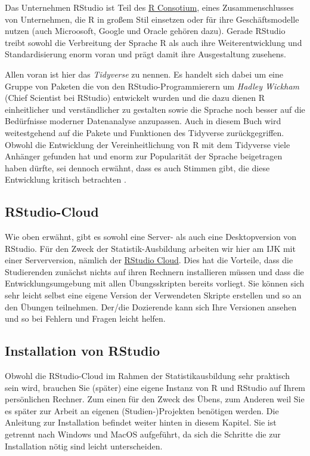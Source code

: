 \documentclass[
]{book}
\begin{document}
Das Unternehmen RStudio ist Teil des \href{https://www.r-consortium.org/}{R Consotium}, eines Zusammenschlusses von Unternehmen, die R in großem Stil einsetzen oder für ihre Geschäftsmodelle nutzen (auch Microosoft, Google und Oracle gehören dazu).
Gerade RStudio treibt sowohl die Verbreitung der Sprache R als auch ihre Weiterentwicklung und Standardisierung enorm voran und prägt damit ihre Ausgestaltung zusehens.

Allen voran ist hier das \emph{Tidyverse} zu nennen. Es handelt sich dabei um eine Gruppe von Paketen die von den RStudio-Programmierern um \emph{Hadley Wickham} (Chief Scientist bei RStudio) entwickelt wurden und die dazu dienen R einheitlicher und verständlicher zu gestalten sowie die Sprache noch besser auf die Bedürfnisse moderner Datenanalyse anzupassen. Auch in diesem Buch wird weitestgehend auf die Pakete und Funktionen des Tidyverse zurückgegriffen.
Obwohl die Entwicklung der Vereinheitlichung von R mit dem Tidyverse viele Anhänger gefunden hat und enorm zur Popularität der Sprache beigetragen haben dürfte, sei dennoch erwähnt, dass es auch Stimmen gibt, die diese Entwicklung kritisch betrachten \citep{Matloff_2019, McChesney_2020}.

\hypertarget{rstudio-cloud}{%
\subsection{RStudio-Cloud}\label{rstudio-cloud}}

Wie oben erwähnt, gibt es sowohl eine Server- als auch eine Desktopversion von RStudio.
Für den Zweck der Statistik-Ausbildung arbeiten wir hier am IJK mit einer Serverversion, nämlich der \href{https://rstudio.cloud/}{RStudio Cloud}.
Dies hat die Vorteile, dass die Studierenden zunächst nichts auf ihren Rechnern installieren müssen und dass die Entwicklungsumgebung mit allen Übungsskripten bereits vorliegt.
Sie können sich sehr leicht selbst eine eigene Version der Verwendeten Skripte erstellen und so an den Übungen teilnehmen.
Der/die Dozierende kann sich Ihre Versionen ansehen und so bei Fehlern und Fragen leicht helfen.

\hypertarget{installation-von-rstudio}{%
\subsection{Installation von RStudio}\label{installation-von-rstudio}}

Obwohl die RStudio-Cloud im Rahmen der Statistikausbildung sehr praktisch sein wird, brauchen Sie (später) eine eigene Instanz von R und RStudio auf Ihrem persönlichen Rechner. Zum einen für den Zweck des Übens, zum Anderen weil Sie es später zur Arbeit an eigenen (Studien-)Projekten benötigen werden.
Die Anleitung zur Installation befindet weiter hinten in diesem Kapitel.
Sie ist getrennt nach Windows und MacOS aufgeführt, da sich die Schritte die zur Installation nötig sind leicht unterscheiden.
\end{document}
